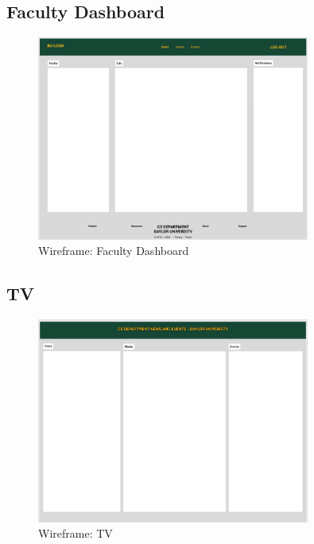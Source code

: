 \documentclass{article}
\begin{document}
\subsection{Faculty Dashboard}
\begin{figure}[H]
    \centering
    \includegraphics[width=0.8\textwidth]{images/wireframe_FacultyDashboard.png}
    \centering
    \caption{Wireframe: Faculty Dashboard}
\end{figure}

\subsection{TV}
\begin{figure}[H]
    \centering
    \includegraphics[width=0.8\textwidth]{images/wireframe_TV_Display.png}
    \centering
    \caption{Wireframe: TV}
\end{figure}
\end{document}
